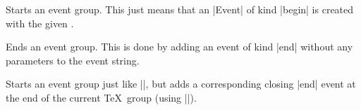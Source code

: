 \begin{command}{\pgfgdbegineventgroup{}}
  Starts an event group. This just means that an |Event| of kind
  |begin| is created with the given .
\end{command}

\begin{command}{\pgfgdendeventgroup}
  Ends an event group. This is done by adding an event of kind |end|
  without any parameters to the event string.
\end{command}

\begin{command}{\pgfgdeventgroup{}}
  Starts an event group just like |\pgfgdbegineventgroup|, but adds a
  corresponding closing |end| event at the end of the current \TeX\
  group (using |\aftergroup|).
\end{command}


